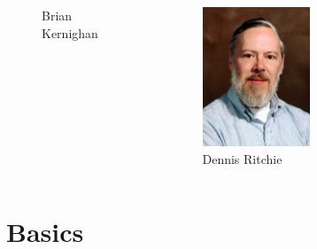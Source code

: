 \documentclass[english,compress]{beamer}
\begin{document}
\begin{frame}
\begin{columns}
\begin{figure}[h]
\begin{center}
		\end{center}
		\caption{Brian Kernighan}
	\end{figure}
	\begin{figure}[h]
		\begin{center}
			\includegraphics[width=0.5\textwidth]{ritchie.jpg}
		\end{center}
		\caption{Dennis Ritchie}
	\end{figure}
	\end{columns}
\end{frame}

\section{Basics}
\end{document}
